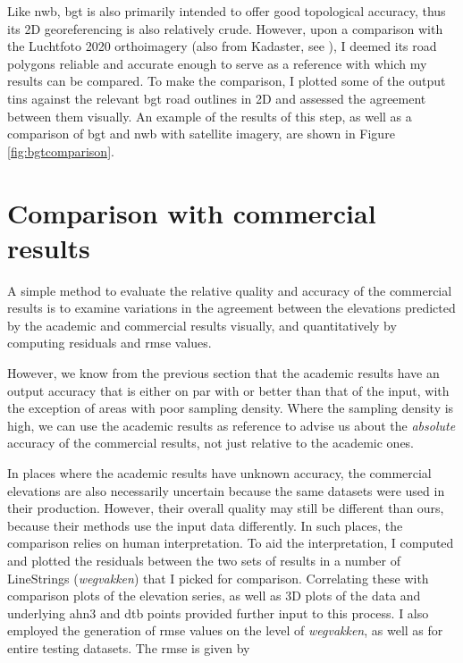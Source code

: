 Like \ac{nwb}, \ac{bgt} is also primarily intended to offer good topological accuracy, thus its 2D georeferencing is also relatively crude. However, upon a comparison with the Luchtfoto 2020 orthoimagery (also from Kadaster, see \cite{luchtfoto_pdok}), I deemed its road polygons reliable and accurate enough to serve as a reference with which my results can be compared. To make the comparison, I plotted some of the output \ac{tin}s against the relevant \ac{bgt} road outlines in 2D and assessed the agreement between them visually. An example of the results of this step, as well as a comparison of \ac{bgt} and \ac{nwb} with satellite imagery, are shown in Figure \ref{fig:bgtcomparison}.

\section{Comparison with commercial results}
\label{sec:m_comparison}

A simple method to evaluate the relative quality and accuracy of the commercial results is to examine variations in the agreement between the elevations predicted by the academic and commercial results visually, and quantitatively by computing residuals and \ac{rmse} values.

However, we know from the previous section that the academic results have an output accuracy that is either on par with or better than that of the input, with the exception of areas with poor sampling density. Where the sampling density is high, we can use the academic results as reference to advise us about the \textit{absolute} accuracy of the commercial results, not just relative to the academic ones.

In places where the academic results have unknown accuracy, the commercial elevations are also necessarily uncertain because the same datasets were used in their production. However, their overall quality may still be different than ours, because their methods use the input data differently. In such places, the comparison relies on human interpretation. To aid the interpretation, I computed and plotted the residuals between the two sets of results in a number of LineStrings (\textit{wegvakken}) that I picked for comparison. Correlating these with comparison plots of the elevation series, as well as 3D plots of the data and underlying \ac{ahn3} and \ac{dtb} points provided further input to this process. I also employed the generation of \ac{rmse} values on the level of \textit{wegvakken}, as well as for entire testing datasets. The \ac{rmse} is given by

